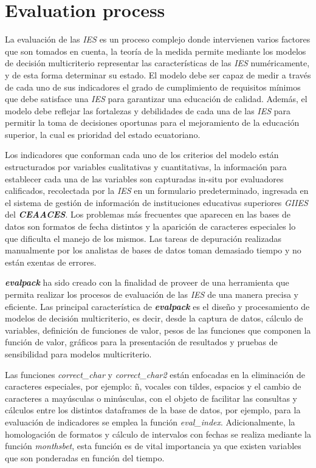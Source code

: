 \section{Evaluation process}
La evaluación de las {\it IES} es un proceso complejo donde intervienen varios factores que son
tomados en cuenta, la teoría de la medida permite mediante los modelos de decisión multicriterio
representar las características de las {\it IES} numéricamente\citep{2}, y de esta forma determinar
su estado. El modelo debe ser capaz de medir a través de cada uno de sus indicadores el grado de
cumplimiento de requisitos mínimos que debe satisface una {\it IES} para garantizar una educación de
calidad. Además, el modelo debe reflejar las fortalezas y debilidades de cada una de las {\it IES}
para permitir la toma de decisiones oportunas para el mejoramiento de la educación superior, la cual
es prioridad del estado ecuatoriano.

Los indicadores que conforman cada uno de los criterios del modelo están estructurados por variables
cualitativas y cuantitativas, la información para establecer cada una de las variables son
capturadas in-situ por evaluadores calificados, recolectada por la {\it IES} en un formulario
predeterminado, ingresada en el sistema de gestión de información de instituciones educativas
superiores {\it GIIES} del \textit{\textbf{CEAACES}}. Los problemas más frecuentes que aparecen en
las bases de datos son formatos de fecha distintos y la aparición de caracteres especiales lo que
dificulta el manejo de los mismos. Las tareas de depuración realizadas manualmente por los analistas
de bases de datos toman demasiado tiempo y no están exentas de errores.

\textit{\textbf{evalpack}} ha sido creado con la finalidad de proveer de una herramienta que permita
realizar los procesos de evaluación de las {\it IES} de una manera precisa y eficiente. Las
principal característica de \textit{\textbf{evalpack}} es el diseño y procesamiento de modelos de
decisión multicriterio, es decir, desde la captura de datos, cálculo de variables, definición de
funciones de valor, pesos de las funciones que componen la función de valor, gráficos para la
presentación de resultados y pruebas de sensibilidad para modelos multicriterio.
       
Las funciones {\it correct\_char} y {\it correct\_char2} están enfocadas en la eliminación
de caracteres especiales, por ejemplo: ñ, vocales con tildes, espacios y el cambio de caracteres a
mayúsculas o minúsculas, con el objeto de facilitar las consultas y cálculos entre los distintos
dataframes de la base de datos, por ejemplo, para la  evaluación de indicadores se emplea la función
{\it eval\_index}. Adicionalmente, la homologación de formatos y cálculo de intervalos con fechas se
realiza mediante la función {\it monthsbet}, esta función es de vital importancia ya que existen
variables que son ponderadas en función del tiempo.\\


